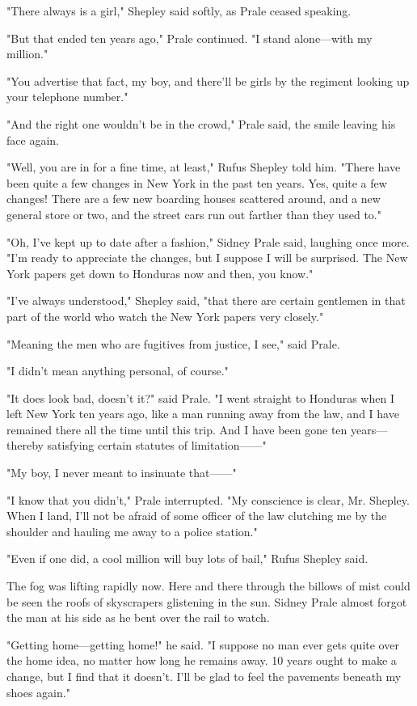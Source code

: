 \documentclass{novel}
\begin{document}
"There always is a girl," Shepley said softly, as Prale ceased speaking.

"But that ended ten years ago," Prale continued. "I stand alone---with my million."

"You advertise that fact, my boy, and there'll be girls by the regiment looking up your telephone number."

"And the right one wouldn't be in the crowd," Prale said, the smile leaving his face again.

"Well, you are in for a fine time, at least," Rufus Shepley told him. "There have been quite a few changes in New York in the past ten years. Yes, quite a few changes! There are a few new boarding houses scattered around, and a new general store or two, and the street cars run out farther than they used to."

"Oh, I've kept up to date after a fashion," Sidney Prale said, laughing once more. "I'm ready to appreciate the changes, but I suppose I will be surprised. The New York papers get down to Honduras now and then, you know."

"I've always understood," Shepley said, "that there are certain gentlemen in that part of the world who watch the New York papers very closely."

"Meaning the men who are fugitives from justice, I see," said Prale.

"I didn't mean anything personal, of course."

"It does look bad, doesn't it?" said Prale. "I went straight to Honduras when I left New York ten years ago, like a man running away from the law, and I have remained there all the time until this trip. And I have been gone ten years---thereby satisfying certain statutes of limitation------"

"My boy, I never meant to insinuate that------"

"I know that you didn't," Prale interrupted. "My conscience is clear, Mr. Shepley. When I land, I'll not be afraid of some officer of the law clutching me by the shoulder and hauling me away to a police station."

"Even if one did, a cool million will buy lots of bail," Rufus Shepley said.

The fog was lifting rapidly now. Here and there through the billows of mist could be seen the roofs of skyscrapers glistening in the sun. Sidney Prale almost forgot the man at his side as he bent over the rail to watch.

"Getting home---getting home!" he said. "I suppose no man ever gets quite over the home idea, no matter how long he remains away. 10 years ought to make a change, but I find that it doesn't. I'll be glad to feel the pavements beneath my shoes again."
\end{document}
